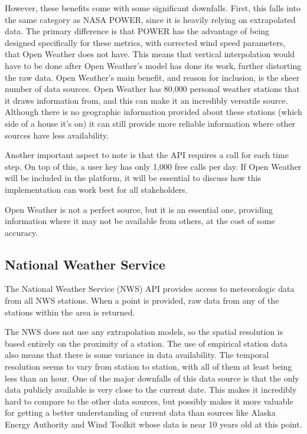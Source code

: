 \documentclass[12pt, oneside]{article}   	%
\begin{document}
However, these benefits come with some significant downfalls. First, this falls
into the same category as NASA POWER, since it is heavily relying on
extrapolated data. The primary difference is that POWER has the advantage of
being designed specifically for these metrics, with corrected wind speed
parameters, that Open Weather does not have. This means that vertical
interpolation would have to be done after Open Weather's model has done its
work, further distorting the raw data. Open Weather's main benefit, and reason
for inclusion, is the sheer number of data sources. Open Weather has 80,000
personal weather stations that it draws information from, and this can make it
an incredibly versatile source.\cite{OPEN-HOME} Although there is no geographic
information provided about these stations (which side of a house it's on) it can
still provide more reliable information where other sources have less
availability.

Another important aspect to note is that the API requires a call for each time
step. On top of this, a user key has only 1,000 free calls per day. If Open
Weather will be included in the platform, it will be essential to discuss how
this implementation can work best for all stakeholders.

Open Weather is not a perfect source, but it is an essential one, providing
information where it may not be available from others, at the cost of some
accuracy.

\subsection{National Weather Service}
The National Weather Service (NWS) API provides access to meteorologic data from
all NWS stations. When a point is provided, raw data from any of the stations
within the area is returned.

The NWS does not use any extrapolation models, so the spatial resolution is
based entirely on the proximity of a station. The use of empirical station data
also means that there is some variance in data availability. The temporal
resolution seems to vary from station to station, with all of them at least
being less than an hour. One of the major downfalls of this data source is that
the only data publicly available is very close to the current date. This makes
it incredibly hard to compare to the other data sources, but possibly makes it
more valuable for getting a better understanding of current data than sources
like Alaska Energy Authority and Wind Toolkit whose data is near 10 years old at
this point.
\end{document}
